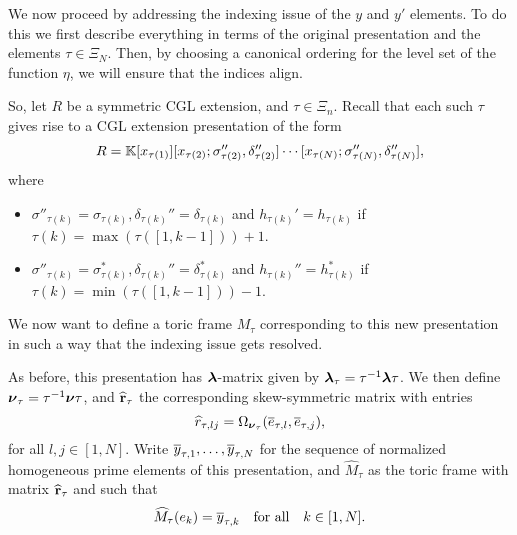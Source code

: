 We now proceed by addressing the indexing issue of the $y$ and $y'$ elements. To do
this we first describe everything in terms of the original presentation and the
elements $\tau \in \Xi_N$. Then, by choosing a canonical ordering for the level set of
the function $\eta$, we will ensure that the indices align.

So, let $R$ be a symmetric CGL extension, and $\tau \in \Xi_n$. Recall that each such
$\tau$ gives rise to a CGL extension presentation of the form
\begin{equation*}
	R = \mathbb{K}[x_{\tau(1)}][x_{\tau(2)}; \sigma_{\tau(2)}'', \delta_{\tau(2)}''] \cdots [x_{\tau(N)}; \sigma_{\tau(N)}'', \delta_{\tau(N)}''],
\end{equation*}
%
where
\begin{itemize}
	\item $\sigma''_{\tau(k)} = \sigma_{\tau(k)}, \delta_{\tau(k)}'' = \delta_{\tau(k)}$
	      and $h_{\tau(k)}' = h_{\tau(k)}$ if $\tau(k) = \max(\tau([1,k-1])) + 1$.
	\item $\sigma''_{\tau(k)} = \sigma^*_{\tau(k)}, \delta_{\tau(k)}'' = \delta^*_{\tau(k)}$ and
	      $h_{\tau(k)}'' = h_{\tau(k)}^*$ if $\tau(k) = \min(\tau([1,k-1])) - 1$.
\end{itemize}

We now want to define a toric frame $M_\tau$ corresponding to this new presentation in
such a way that the indexing issue gets resolved.

As before, this presentation has $\boldsymbol{\lambda}$-matrix given by $\boldsymbol{\lambda}_\tau = \tau^{-1} \boldsymbol{\lambda}
	\tau$. We then define $\boldsymbol{\nu}_\tau = \tau^{-1} \boldsymbol{\nu}
	\tau$, and $\widehat{\mathbf{r}}_\tau$ the corresponding skew-symmetric matrix with entries
\begin{equation*}
	\widehat{r}_{\tau, lj} = \Omega_{\boldsymbol{\nu}_\tau}(\overline{e}_{\tau, l}, \overline{e}_{\tau, j}),
\end{equation*}
%
for all $l, j \in [1, N]$.	Write $\overline{y}_{\tau, 1}, \dots, \overline{y}_{\tau, N}$ for the sequence of normalized homogeneous prime elements
of this presentation, and $\widehat{M}_\tau$ as the
toric frame with matrix $\widehat{\mathbf{r}}_\tau$ and such that
\begin{equation*}
	\widehat{M}_\tau (e_k) =
	\overline{y}_{\tau, k} \quad \text{for all}\quad k \in [1, N].
\end{equation*}

